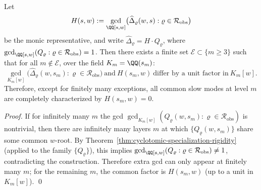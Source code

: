 \begin{theorem}\label{thm:cyclotomic-gcd-stability}
Let
\[
H(s,w):=\gcd_{\QQ[s,w]}\bigl(\widehat{\Delta}_{\varrho}(w,s):\varrho\in\mathcal{R}_{\mathrm{obs}}\bigr)
\]
be the monic representative, and write \(\widehat{\Delta}_{\varrho}=H\cdot Q_{\varrho}\), where
\(
\gcd_{\QQ[s,w]}(Q_{\varrho}:\varrho\in\mathcal{R}_{\mathrm{obs}})=1
\).
Then there exists a finite set \(\mathcal{E}\subset\{m\ge 3\}\) such that for all \(m\notin\mathcal{E}\), over the field \(K_m=\QQ(s_m)\):
\[
\gcd_{K_m[w]}\bigl(\widehat{\Delta}_{\varrho}(w,s_m):\varrho\in\mathcal{R}_{\mathrm{obs}}\bigr)
\ \text{and}\ H(s_m,w)\ \text{differ by a unit factor in}\ K_m[w].
\]
Therefore, except for finitely many exceptions, all common slow modes at level \(m\) are completely characterized by \(H(s_m,w)=0\).
\end{theorem}
\begin{proof}
If for infinitely many \(m\) the gcd
\(
\gcd_{K_m[w]}(Q_{\varrho}(w,s_m):\varrho\in\mathcal{R}_{\mathrm{obs}})
\)
is nontrivial, then there are infinitely many layers \(m\) at which \(\{Q_{\varrho}(w,s_m)\}\) share some common \(w\)-root.
By Theorem~\ref{thm:cyclotomic-specialization-rigidity} (applied to the family \(\{Q_{\varrho}\}\)), this implies
\(
\gcd_{\QQ[s,w]}(Q_{\varrho}:\varrho\in\mathcal{R}_{\mathrm{obs}})\neq 1
\), contradicting the construction.
Therefore extra gcd can only appear at finitely many \(m\); for the remaining \(m\), the common factor is \(H(s_m,w)\) (up to a unit in \(K_m[w]\)). \qed
\end{proof}


